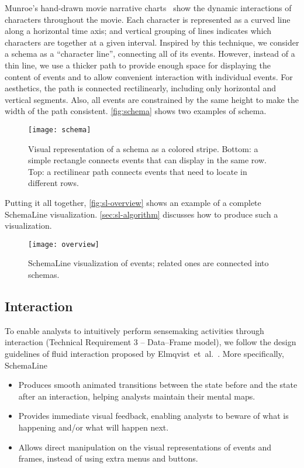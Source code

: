 Munroe's hand-drawn movie narrative charts~\cite{Munroe2009} show the dynamic interactions of characters throughout the movie. Each character is represented as a curved line along a horizontal time axis; and vertical grouping of lines indicates which characters are together at a given interval. Inspired by this technique, we consider a schema as a ``character line'', connecting all of its events. However, instead of a thin line, we use a thicker path to provide enough space for displaying the content of events and to allow convenient interaction with individual events. For aesthetics, the path is connected rectilinearly, including only horizontal and vertical segments. Also,  all events are constrained by the same height to make the width of the path consistent. \autoref{fig:schema} shows two examples of schema. 

\begin{figure}[!htb]
	\centering
	\texttt{[image: schema]}
	\caption{Visual representation of a schema as a colored stripe. Bottom: a simple rectangle connects events that can display in the same row. Top: a rectilinear path connects events that need to locate in different rows.}
	\label{fig:schema}
\end{figure}

Putting it all together, \autoref{fig:sl-overview} shows an example of a complete SchemaLine visualization. \autoref{sec:sl-algorithm} discusses how to produce such a visualization.

\begin{figure}[!htb]
	\centering
	\texttt{[image: overview]}
	\caption{SchemaLine visualization of events; related ones are connected into schemas.}
	\label{fig:sl-overview}
\end{figure}

\subsection{Interaction}
To enable analysts to intuitively perform sensemaking activities through interaction (Technical Requirement 3 -- Data--Frame model), we follow the design guidelines of fluid interaction proposed by Elmqvist~et~al.~\cite{Elmqvist2011}. More specifically, SchemaLine 
\begin{itemize}
	\item Produces smooth animated transitions between the state before and the state after an interaction, helping analysts maintain their mental maps.
	\item Provides immediate visual feedback, enabling analysts to beware of what is happening and/or what will happen next.
	\item Allows direct manipulation on the visual representations of events and frames, instead of using extra menus and buttons.
\end{itemize}

